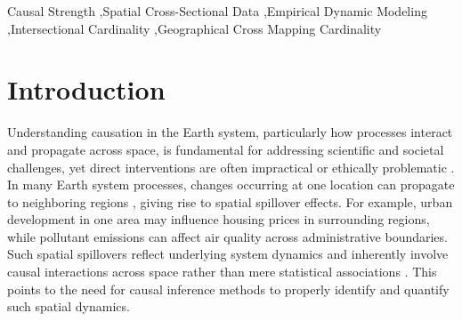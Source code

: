 \documentclass[authoryear,preprint,review,12pt]{elsarticle}
\begin{document}
\begin{frontmatter}
\begin{abstract}
\end{abstract}

\begin{keyword}
Causal Strength \sep Spatial Cross-Sectional Data \sep Empirical Dynamic Modeling \sep Intersectional Cardinality \sep Geographical Cross Mapping Cardinality
\end{keyword}

\end{frontmatter}

\linenumbers

\section{Introduction}

Understanding causation in the Earth system, particularly how processes interact and propagate across space, is fundamental for addressing scientific and societal challenges, yet direct interventions are often impractical or ethically problematic \citep{gao2022tscess,runge2023tsc,gao2023gccm}. In many Earth system processes, changes occurring at one location can propagate to neighboring regions \citep{herrera2016spatialgranger}, giving rise to spatial spillover effects. For example, urban development in one area may influence housing prices in surrounding regions, while pollutant emissions can affect air quality across administrative boundaries. Such spatial spillovers reflect underlying system dynamics and inherently involve causal interactions across space rather than mere statistical associations \citep{lyu2026tEDM}. This points to the need for causal inference methods to properly identify and quantify such spatial dynamics. 
\end{document}
